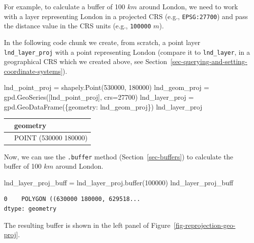 \documentclass[
  letterpaper,
]{krantz}
\newenvironment{Shaded}{\begin{snugshade}}{\end{snugshade}}
\newcommand{\BuiltInTok}[1]{\textcolor[rgb]{0.00,0.23,0.31}{#1}}
\newcommand{\DecValTok}[1]{\textcolor[rgb]{0.68,0.00,0.00}{#1}}
\newcommand{\NormalTok}[1]{\textcolor[rgb]{0.00,0.23,0.31}{#1}}
\newcommand{\OperatorTok}[1]{\textcolor[rgb]{0.37,0.37,0.37}{#1}}
\newcommand{\StringTok}[1]{\textcolor[rgb]{0.13,0.47,0.30}{#1}}
\begin{document}
For example, to calculate a buffer of 100 \(km\) around London, we need
to work with a layer representing London in a projected CRS (e.g.,
\texttt{EPSG:27700}) and pass the distance value in the CRS units (e.g.,
\texttt{100000} \(m\)).

In the following code chunk we create, from scratch, a point layer
\texttt{lnd\_layer\_proj} with a point representing London (compare it
to \texttt{lnd\_layer}, in a geographical CRS which we created above,
see Section~\ref{sec-querying-and-setting-coordinate-systems}).

\begin{Shaded}
\begin{Highlighting}[]
\NormalTok{lnd\_point\_proj }\OperatorTok{=}\NormalTok{ shapely.Point(}\DecValTok{530000}\NormalTok{, }\DecValTok{180000}\NormalTok{)}
\NormalTok{lnd\_geom\_proj }\OperatorTok{=}\NormalTok{ gpd.GeoSeries([lnd\_point\_proj], crs}\OperatorTok{=}\DecValTok{27700}\NormalTok{)}
\NormalTok{lnd\_layer\_proj }\OperatorTok{=}\NormalTok{ gpd.GeoDataFrame(\{}\StringTok{\textquotesingle{}geometry\textquotesingle{}}\NormalTok{: lnd\_geom\_proj\})}
\NormalTok{lnd\_layer\_proj}
\end{Highlighting}
\end{Shaded}

\begin{longtable}[]{@{}ll@{}}
\toprule\noalign{}
& geometry \\
\midrule\noalign{}
\endhead
\bottomrule\noalign{}
\endlastfoot
0 & POINT (530000 180000) \\
\end{longtable}

Now, we can use the \texttt{.buffer} method (Section~\ref{sec-buffers})
to calculate the buffer of 100 \(km\) around London.

\begin{Shaded}
\begin{Highlighting}[]
\NormalTok{lnd\_layer\_proj\_buff }\OperatorTok{=}\NormalTok{ lnd\_layer\_proj.}\BuiltInTok{buffer}\NormalTok{(}\DecValTok{100000}\NormalTok{)}
\NormalTok{lnd\_layer\_proj\_buff}
\end{Highlighting}
\end{Shaded}

\begin{verbatim}
0    POLYGON ((630000 180000, 629518...
dtype: geometry
\end{verbatim}

The resulting buffer is shown in the left panel of
Figure~\ref{fig-reprojection-geo-proj}.
\end{document}
